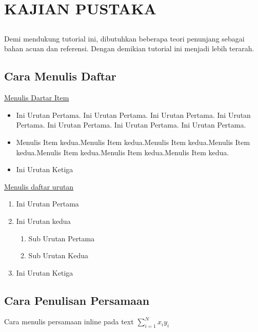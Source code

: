 \chapter{KAJIAN PUSTAKA}


\section*{ }
Demi mendukung tutorial ini, dibutuhkan beberapa teori penunjang sebagai bahan acuan dan referensi. Dengan demikian tutorial ini menjadi lebih terarah. 
\vspace{1ex}

\section{Cara Menulis Daftar}
\underline{Menulis Dartar Item}
\begin{itemize}
	\item Ini Urutan Pertama. Ini Urutan Pertama. Ini Urutan Pertama. Ini Urutan Pertama. Ini Urutan Pertama. Ini Urutan Pertama. Ini Urutan Pertama. 
	\item Menulis Item kedua.Menulis Item kedua.Menulis Item kedua.Menulis Item kedua.Menulis Item kedua.Menulis Item kedua.Menulis Item kedua.
	\item Ini Urutan Ketiga
\end{itemize}

\underline{Menulis daftar urutan}
\begin{enumerate}
	\item Ini Urutan Pertama
	\item Ini Urutan kedua
	\begin{enumerate}
		\item Sub Urutan Pertama
		\item Sub Urutan Kedua
	\end{enumerate} 
	\item Ini Urutan Ketiga
\end{enumerate}


\section{Cara Penulisan Persamaan}
Cara menulis persamaan  inline pada text $\sum_{i=1}^{N} x_iy_i$


